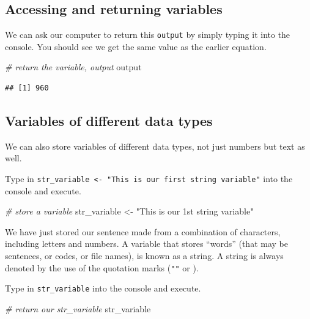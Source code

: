 \documentclass[
]{book}
\newenvironment{Shaded}{\begin{snugshade}}{\end{snugshade}}
\newcommand{\CommentTok}[1]{\textcolor[rgb]{0.56,0.35,0.01}{\textit{#1}}}
\newcommand{\NormalTok}[1]{#1}
\newcommand{\OtherTok}[1]{\textcolor[rgb]{0.56,0.35,0.01}{#1}}
\newcommand{\StringTok}[1]{\textcolor[rgb]{0.31,0.60,0.02}{#1}}
\begin{document}
\hypertarget{accessing-and-returning-variables}{%
\subsection{Accessing and returning variables}\label{accessing-and-returning-variables}}

We can ask our computer to return this \texttt{output} by simply typing it into the console. You should see we get the same value as the earlier equation.

\begin{Shaded}
\begin{Highlighting}[]
\CommentTok{\# return the variable, output}
\NormalTok{output}
\end{Highlighting}
\end{Shaded}

\begin{verbatim}
## [1] 960
\end{verbatim}

\hypertarget{variables-of-different-data-types}{%
\subsection{Variables of different data types}\label{variables-of-different-data-types}}

We can also store variables of different data types, not just numbers but text as well.

Type in \texttt{str\_variable\ \textless{}-\ "This\ is\ our\ first\ string\ variable"} into the console and execute.

\begin{Shaded}
\begin{Highlighting}[]
\CommentTok{\# store a variable}
\NormalTok{str\_variable }\OtherTok{\textless{}{-}} \StringTok{"This is our 1st string variable"}
\end{Highlighting}
\end{Shaded}

We have just stored our sentence made from a combination of characters, including letters and numbers. A variable that stores ``words'' (that may be sentences, or codes, or file names), is known as a string. A string is always denoted by the use of the quotation marks (\texttt{""} or \texttt{\textquotesingle{}\textquotesingle{}}).

Type in \texttt{str\_variable} into the console and execute.

\begin{Shaded}
\begin{Highlighting}[]
\CommentTok{\# return our str\_variable}
\NormalTok{str\_variable}
\end{Highlighting}
\end{Shaded}
\end{document}
